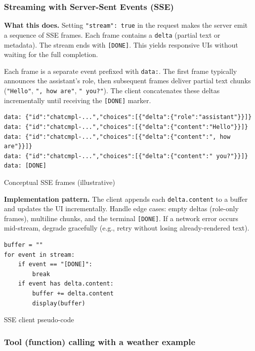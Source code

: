 \documentclass[english]{article}
\begin{document}
\subsubsection{Streaming with Server-Sent Events (SSE)}

\noindent\textbf{What this does.}
Setting \texttt{"stream": true} in the request makes the server emit a sequence of SSE frames. Each frame contains a \texttt{delta} (partial text or metadata). The stream ends with \texttt{[DONE]}. This yields responsive UIs without waiting for the full completion.

Each frame is a separate event prefixed with \texttt{data:}. The first frame typically announces the assistant's role, then subsequent frames deliver partial text chunks (\texttt{"Hello"}, \texttt{", how are"}, \texttt{" you?"}). The client concatenates these deltas incrementally until receiving the \texttt{[DONE]} marker.

\begin{listing}[H]
\begin{verbatim}
data: {"id":"chatcmpl-...","choices":[{"delta":{"role":"assistant"}}]}
data: {"id":"chatcmpl-...","choices":[{"delta":{"content":"Hello"}}]}
data: {"id":"chatcmpl-...","choices":[{"delta":{"content":", how are"}}]}
data: {"id":"chatcmpl-...","choices":[{"delta":{"content":" you?"}}]}
data: [DONE]
\end{verbatim}
\caption{Conceptual SSE frames (illustrative)}
\end{listing}

\noindent\textbf{Implementation pattern.}
The client appends each \texttt{delta.content} to a buffer and updates the UI incrementally. Handle edge cases: empty deltas (role-only frames), multiline chunks, and the terminal \texttt{[DONE]}. If a network error occurs mid-stream, degrade gracefully (e.g., retry without losing already-rendered text).

\begin{listing}[H]
\begin{verbatim}
buffer = ""
for event in stream:
    if event == "[DONE]":
        break
    if event has delta.content:
        buffer += delta.content
        display(buffer)
\end{verbatim}
\caption{SSE client pseudo-code}
\end{listing}

\subsubsection{Tool (function) calling with a weather example}
\end{document}
